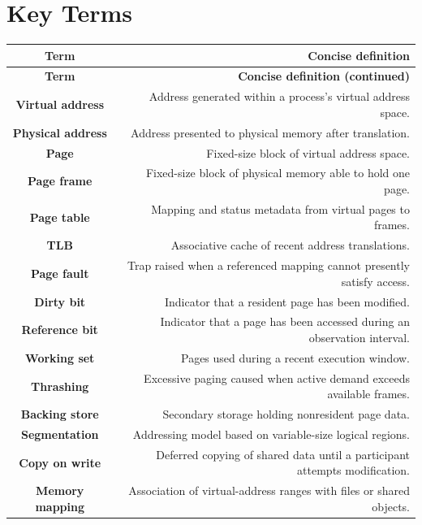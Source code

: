 \documentclass[10pt,letterpaper]{article}
\begin{document}
\section*{Key Terms}
\small
\begin{longtable}{C N}
\color{white}\textbf{Term} & \color{white}\textbf{Concise definition}\\
\endfirsthead
{}\color{white}\textbf{Term} & \color{white}\textbf{Concise definition (continued)}\\
\endhead
\textbf{Virtual address} & Address generated within a process's virtual address space.\\\hline
\textbf{Physical address} & Address presented to physical memory after translation.\\\hline
\textbf{Page} & Fixed-size block of virtual address space.\\\hline
\textbf{Page frame} & Fixed-size block of physical memory able to hold one page.\\\hline
\textbf{Page table} & Mapping and status metadata from virtual pages to frames.\\\hline
\textbf{TLB} & Associative cache of recent address translations.\\\hline
\textbf{Page fault} & Trap raised when a referenced mapping cannot presently satisfy access.\\\hline
\textbf{Dirty bit} & Indicator that a resident page has been modified.\\\hline
\textbf{Reference bit} & Indicator that a page has been accessed during an observation interval.\\\hline
\textbf{Working set} & Pages used during a recent execution window.\\\hline
\textbf{Thrashing} & Excessive paging caused when active demand exceeds available frames.\\\hline
\textbf{Backing store} & Secondary storage holding nonresident page data.\\\hline
\textbf{Segmentation} & Addressing model based on variable-size logical regions.\\\hline
\textbf{Copy on write} & Deferred copying of shared data until a participant attempts modification.\\\hline
\textbf{Memory mapping} & Association of virtual-address ranges with files or shared objects.\\\hline
\end{longtable}
\normalsize
\end{document}
